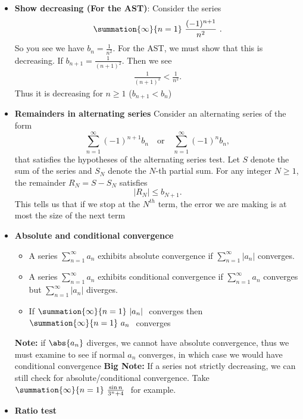 \documentclass{report}
\begin{document}
\begin{itemize}
\item \textbf{Show decreasing (For the AST)}: Consider the series
    \begin{align*}
        \summation{\infty}{n=1}\ \frac{(-1)^{n+1}}{n^{2}}\ 
    .\end{align*}
    \bigbreak \noindent 
    So you see we have $b_{n}=  \frac{1}{n^{2}}$. For the AST, we must show that this is decreasing. If $b_{n+1} = \frac{1}{(n+1)^{2}}$. Then we see
    \begin{align*}
        \frac{1}{(n+1)^{2}} < \frac{1}{n^{2}}
    .\end{align*}
    \bigbreak \noindent 
    Thus it is decreasing for $n \geq 1$ ($b_{n+1} < b_{n}$)
    \blacksquare
\item \textbf{Remainders in alternating series}
    Consider an alternating series of the form
    \[
        \sum_{n=1}^{\infty} (-1)^{n+1} b_n \quad \text{or} \quad \sum_{n=1}^{\infty} (-1)^n b_n,
    \]
    that satisfies the hypotheses of the alternating series test. Let \( S \) denote the sum of the series and \( S_N \) denote the \( N \)-th partial sum. For any integer \( N \geq 1 \), the remainder \( R_N = S - S_N \) satisfies
    \[
        \lvert R_N \rvert \leq b_{N+1}.
    \]
    This tells us that if we stop at the $N^{th}$ term, the error we are making is at most the size of the next term
\item \textbf{Absolute and conditional convergence}
    \begin{itemize}
        \item A series \(\sum_{n=1}^{\infty} a_n\) exhibits absolute convergence if \(\sum_{n=1}^{\infty} |a_n|\) converges.
        \item A series \(\sum_{n=1}^{\infty} a_n\) exhibits conditional convergence if \(\sum_{n=1}^{\infty} a_n\) converges but \(\sum_{n=1}^{\infty} |a_n|\) diverges.
        \item If $\summation{\infty}{n=1}\ \lvert a_{n} \rvert\ $ converges then $\summation{\infty}{n=1}\ a_{n}\ $ converges
    \end{itemize}
    \bigbreak \noindent 
    \textbf{Note:} if $\abs{a_{n}}$ diverges, we cannot have absolute convergence, thus we must examine to see if normal $a_{n}$ converges, in which case we would have conditional convergence
    \bigbreak \noindent 
    \textbf{Big Note:} If a series not strictly decreasing, we can still check for absolute/conditional convergence. Take $\summation{\infty}{n=1}\ \frac{\sin{n}}{3^{n} + 4}\  $ for example.
\item \textbf{Ratio test}

\end{itemize}
\end{document}
